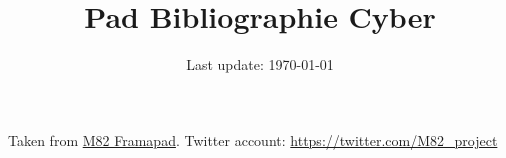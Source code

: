 \documentclass[12pt,a4paper]{article}
\author{Last update: \today}
\title{Pad Bibliographie Cyber}
\date{}
\begin{document}
\maketitle
\thispagestyle{empty}
Taken from \href{https://mypads2.framapad.org/mypads/?/mypads/group/m82-2d1f1g9ht/pad/view/bibliographie-cyber-yh1f2g9lo}{M82 Framapad}. Twitter account: \url{https://twitter.com/M82_project}\nocite{*}
\renewcommand{\thepage}{}


\end{document}
